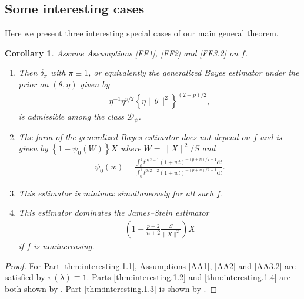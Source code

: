 \documentclass[preprint,11pt]{imsart}
\numberwithin{equation}{section}
\theoremstyle{plain}
\newtheorem{corollary}{Corollary}[section]
\theoremstyle{definition}
\theoremstyle{remark}
\newcommand{\rd}{\mathrm{d}}
\begin{document}
  \subsection{Some interesting cases}
\label{sub.sec.interesting}
Here we present three interesting special cases of our main general theorem.
\begin{corollary}\label{thm:interesting.1}
Assume 
Assumptions \ref{FF1}, \ref{FF2} and \ref{FF3.2} on $f$.
 \begin{enumerate}
  \item \label{thm:interesting.1.1}
	Then $\delta_\pi$ with $\pi\equiv 1$, or equivalently the generalized Bayes estimator under
the prior on $(\theta,\eta)$ given by 
	\begin{align*}
  \eta^{-1}\eta^{p/2}\left\{\eta\|\theta\|^2\right\}^{(2-p)/2},
	\end{align*}
is admissible among the class $\mathcal{D}_\psi$. 
  \item \label{thm:interesting.1.2}
	The form of the generalized Bayes estimator does not depend on $f$ and is given by
$\left\{1-\psi_0(W)\right\}X$ where $W=\|X\|^2/S$ and
	\begin{align*}
 \psi_0(w)=
  \frac{\int_0^1 t^{p/2-1}(1+wt)^{-(p+n)/2-1}\rd t}{\int_0^1 t^{p/2-2}(1+wt)^{-(p+n)/2-1}\rd t}.
	\end{align*}
  \item \label{thm:interesting.1.3}
	This estimator is minimax simultaneously for all such $f$.
  \item \label{thm:interesting.1.4}
	This estimator dominates the James--Stein estimator
		\begin{align*}
 \left(1-\frac{p-2}{n+2}\frac{S}{\|X\|^2}\right)X
\end{align*}
if $f$ is nonincreasing.
 \end{enumerate}
\end{corollary}
\begin{proof}
 For Part \ref{thm:interesting.1.1}, Assumptions \ref{AA1}, \ref{AA2} and \ref{AA3.2} are satisfied by
 $\pi(\lambda)\equiv 1$.
 Parts \ref{thm:interesting.1.2} and \ref{thm:interesting.1.4} are both shown by \cite{Maruyama-2003b}.
Part \ref{thm:interesting.1.3} is shown by \cite{Cellier-et-al-1989}.
\end{proof}
\end{document}
